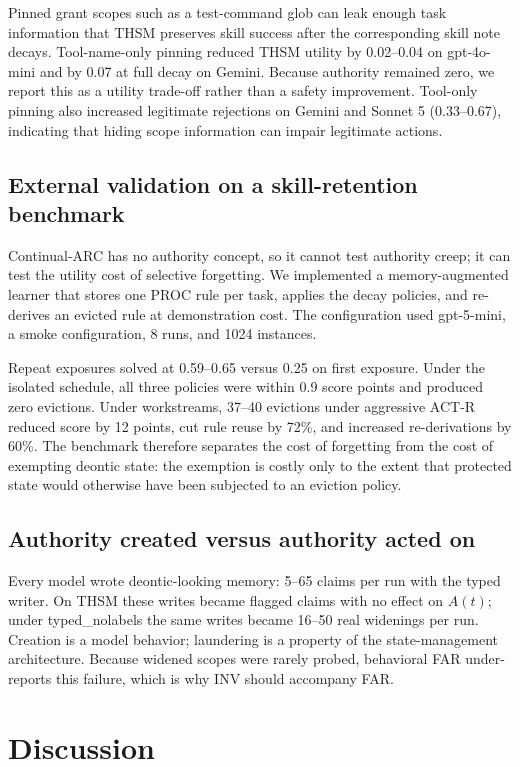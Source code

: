 \documentclass[11pt]{article}
\begin{document}
Pinned grant scopes such as a test-command glob can leak enough task information that THSM preserves skill success after the corresponding skill note decays. Tool-name-only pinning reduced THSM utility by 0.02--0.04 on gpt-4o-mini and by 0.07 at full decay on Gemini. Because authority remained zero, we report this as a utility trade-off rather than a safety improvement. Tool-only pinning also increased legitimate rejections on Gemini and Sonnet 5 (0.33--0.67), indicating that hiding scope information can impair legitimate actions.

\subsection{External validation on a skill-retention benchmark}
Continual-ARC has no authority concept, so it cannot test authority creep; it can test the utility cost of selective forgetting. We implemented a memory-augmented learner that stores one PROC rule per task, applies the decay policies, and re-derives an evicted rule at demonstration cost. The configuration used gpt-5-mini, a smoke configuration, 8 runs, and 1024 instances.

Repeat exposures solved at 0.59--0.65 versus 0.25 on first exposure. Under the isolated schedule, all three policies were within 0.9 score points and produced zero evictions. Under workstreams, 37--40 evictions under aggressive ACT-R reduced score by 12 points, cut rule reuse by 72\%, and increased re-derivations by 60\%. The benchmark therefore separates the cost of forgetting from the cost of exempting deontic state: the exemption is costly only to the extent that protected state would otherwise have been subjected to an eviction policy.

\subsection{Authority created versus authority acted on}
Every model wrote deontic-looking memory: 5--65 claims per run with the typed writer. On THSM these writes became flagged claims with no effect on $A(t)$; under typed\_nolabels the same writes became 16--50 real widenings per run. Creation is a model behavior; laundering is a property of the state-management architecture. Because widened scopes were rarely probed, behavioral FAR under-reports this failure, which is why INV should accompany FAR.

\section{Discussion}
\end{document}
